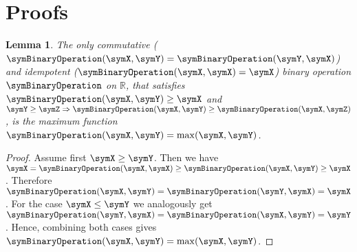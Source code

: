 \documentclass[sigconf, nonacm]{acmart}
\newtheorem{lemma}{Lemma}
\newif\ifextended\extendedtrue
\begin{document}
\ifextended

\appendix 

\section{Proofs}

\begin{lemma}
\label{lem:max_binary_op}
The only commutative ($\symBinaryOperation(\symX,\symY) = \symBinaryOperation(\symY,\symX)$) and idempotent ($\symBinaryOperation(\symX,\symX)=\symX$) binary operation $\symBinaryOperation$ on $\mathbb{R}$, that satisfies $\symBinaryOperation(\symX,\symY)\geq \symX$ and $\symY\geq\symZ\Rightarrow\symBinaryOperation(\symX,\symY)\geq\symBinaryOperation(\symX,\symZ)$, is the maximum function $\symBinaryOperation(\symX,\symY) = \max(\symX,\symY)$.
\end{lemma}
\begin{proof}
Assume first $\symX\geq\symY$. Then we have $\symX = \symBinaryOperation(\symX,\symX) \geq \symBinaryOperation(\symX, \symY) \geq \symX$. Therefore $\symBinaryOperation(\symX, \symY) = \symBinaryOperation(\symY, \symX) = \symX$. For the case $\symX\leq\symY$ we analogously get $\symBinaryOperation(\symY, \symX) = \symBinaryOperation(\symX, \symY) = \symY$. Hence, combining both cases gives $\symBinaryOperation(\symX,\symY) = \max(\symX,\symY)$.
\end{proof}
\end{document}
